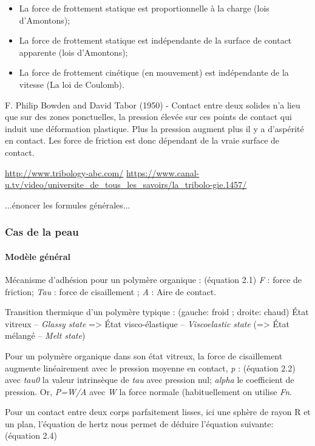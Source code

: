 \begin{itemize}
\item La force de frottement statique est proportionnelle à la charge (lois d’Amontons);
\item La force de frottement statique est indépendante de la surface de contact apparente (lois d’Amontons);
\item La force de frottement cinétique (en mouvement) est indépendante de la vitesse (La loi de Coulomb).
\end{itemize}

F. Philip Bowden and David Tabor (1950) - Contact entre deux solides n'a lieu que sur des zones ponctuelles, la pression élevée sur ces points de contact qui induit une déformation plastique. Plus la pression augment plus il y a d'aspérité en contact. Les force de friction est donc dépendant de la vraie surface de contact.

\url{http://www.tribology-abc.com/}
\url{https://www.canal-u.tv/video/universite_de_tous_les_savoirs/la_tribolo-gie.1457/}

...énoncer les formules générales...

\subsubsection{Cas de la peau}
\paragraph{Modèle général}
Mécanisme d'adhésion pour un polymère organique :
(équation 2.1)
\textit{F} : force de friction; \textit{Tau} : force de cisaillement ; \textit{A} : Aire de contact.

Transition thermique d'un polymère typique : (gauche: froid ; droite: chaud)
État vitreux -- \textit{Glassy state} => État visco-élastique -- \textit{Viscoelastic state} (=> État mélangé -- \textit{Melt state}) 

Pour un polymère organique dans son état vitreux, la force de cisaillement augmente linéairement avec le pression moyenne en contact, \textit{p} :
(équation 2.2)
avec \textit{tau0} la valeur intrinsèque de \textit{tau} avec pression nul; \textit{alpha} le coefficient de pression.
Or, \textit{P=W/A}
avec \textit{W} la force normale (habituellement on utilise \textit{Fn}.
 
Pour un contact entre deux corps parfaitement lisses, ici une sphère de rayon R et un plan, l'équation de hertz nous permet de déduire l'équation suivante:
(équation 2.4)

